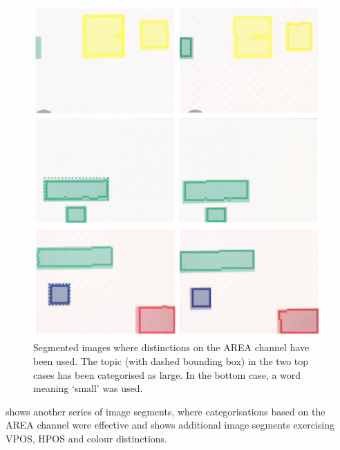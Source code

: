 \begin{figure}
\begin{center}
\includegraphics[width=0.8\columnwidth]{chap7/figs/plate-14-area}
\end{center}
\caption{ Segmented images where distinctions on the AREA channel have been used. The topic (with dashed bounding 
box) in the two top cases has been categorised as large. In the bottom case, a word meaning `small' was used.}
\label{fig:plate-14}
\end{figure}

 shows another series of image segments, 
where categorisations based on the AREA channel were effective
and  shows additional image segments exercising
VPOS, HPOS and colour distinctions. 

